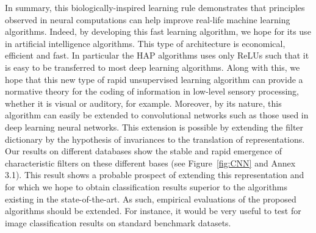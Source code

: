 \documentclass[letterpaper,final,conference,10pt]{IEEEtran}
\newcommand{\Acknowledgments}{%
%
This research has received funding from the European Union’s Horizon 2020 research and innovation programme under the Marie Skłodowska-Curie grant agreement No713750. Also, it has been carried out with the financial support of the Regional Council of Provence-Alpes-Côte d’Azur and with the financial support of the A*MIDEX (n° ANR- 11-IDEX-0001-02), funded by the Investissements d'Avenir project funded by the French Government, managed by the French National Research Agency (ANR).
}
\newcommand{\seeFig}[1]{Figure~\ref{fig:#1}}%
\begin{document}
In summary, this biologically-inspired learning rule demonstrates that principles observed in neural computations can help improve real-life machine learning algorithms. Indeed, by developing this fast learning algorithm, we hope for its use in artificial intelligence algorithms. This type of architecture is economical, efficient and fast. In particular the HAP algorithms uses only ReLUs such that it is easy to be transferred to most deep learning algorithms.  %
Along with this, we hope that this new type of rapid unsupervised learning algorithm can provide a normative theory for the coding of information in low-level sensory processing, whether it is visual or auditory, for example. Moreover, by its nature, this algorithm can easily be extended to convolutional networks such as those used in deep learning neural networks. This extension is possible by extending the filter dictionary by the hypothesis of invariances to the translation of representations. Our results on different databases show the stable and rapid emergence of characteristic filters on these different bases (see \seeFig{CNN} and Annex 3.1). This result shows a probable prospect of extending this representation and for which we hope to obtain classification results superior to the algorithms existing in the state-of-the-art. As such, empirical evaluations of the proposed algorithms should be extended. For instance, it would be very useful to test for image classification results on standard benchmark datasets. %
%
%
\end{document}

